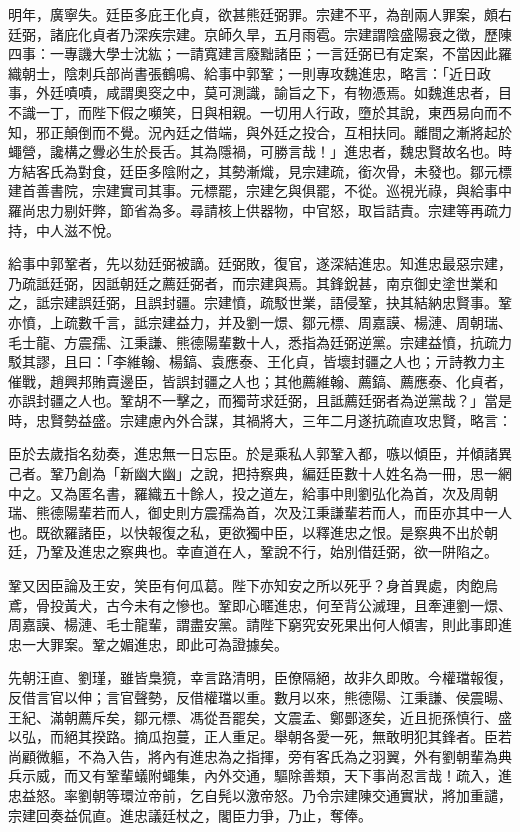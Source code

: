 \begin{pinyinscope}
明年，廣寧失。廷臣多庇王化貞，欲甚熊廷弼罪。宗建不平，為剖兩人罪案，頗右廷弼，諸庇化貞者乃深疾宗建。京師久旱，五月雨雹。宗建謂陰盛陽衰之徵，歷陳四事：一專譏大學士沈紘；一請寬建言廢黜諸臣；一言廷弼已有定案，不當因此羅織朝士，陰刺兵部尚書張鶴鳴、給事中郭鞏；一則專攻魏進忠，略言：「近日政事，外廷嘖嘖，咸謂奧窔之中，莫可測識，諭旨之下，有物憑焉。如魏進忠者，目不識一丁，而陛下假之嚬笑，日與相親。一切用人行政，墮於其說，東西易向而不知，邪正顛倒而不覺。況內廷之借端，與外廷之投合，互相扶同。離間之漸將起於蠅營，讒構之釁必生於長舌。其為隱禍，可勝言哉！」進忠者，魏忠賢故名也。時方結客氏為對食，廷臣多陰附之，其勢漸熾，見宗建疏，銜次骨，未發也。鄒元標建首善書院，宗建實司其事。元標罷，宗建乞與俱罷，不從。巡視光祿，與給事中羅尚忠力剔奸弊，節省為多。尋請核上供器物，中官怒，取旨詰責。宗建等再疏力持，中人滋不悅。

給事中郭鞏者，先以劾廷弼被謫。廷弼敗，復官，遂深結進忠。知進忠最惡宗建，乃疏詆廷弼，因詆朝廷之薦廷弼者，而宗建與焉。其鋒銳甚，南京御史塗世業和之，詆宗建誤廷弼，且誤封疆。宗建憤，疏駁世業，語侵鞏，抉其結納忠賢事。鞏亦憤，上疏數千言，詆宗建益力，并及劉一燝、鄒元標、周嘉謨、楊漣、周朝瑞、毛士龍、方震孺、江秉謙、熊德陽輩數十人，悉指為廷弼逆黨。宗建益憤，抗疏力駁其謬，且曰：「李維翰、楊鎬、袁應泰、王化貞，皆壞封疆之人也；亓詩教力主催戰，趙興邦賄賣邊臣，皆誤封疆之人也；其他薦維翰、薦鎬、薦應泰、化貞者，亦誤封疆之人也。鞏胡不一擊之，而獨苛求廷弼，且詆薦廷弼者為逆黨哉？」當是時，忠賢勢益盛。宗建慮內外合謀，其禍將大，三年二月遂抗疏直攻忠賢，略言：

臣於去歲指名劾奏，進忠無一日忘臣。於是乘私人郭鞏入都，嗾以傾臣，并傾諸異己者。鞏乃創為「新幽大幽」之說，把持察典，編廷臣數十人姓名為一冊，思一網中之。又為匿名書，羅織五十餘人，投之道左，給事中則劉弘化為首，次及周朝瑞、熊德陽輩若而人，御史則方震孺為首，次及江秉謙輩若而人，而臣亦其中一人也。既欲羅諸臣，以快報復之私，更欲獨中臣，以釋進忠之恨。是察典不出於朝廷，乃鞏及進忠之察典也。幸直道在人，鞏說不行，始別借廷弼，欲一阱陷之。

鞏又因臣論及王安，笑臣有何瓜葛。陛下亦知安之所以死乎？身首異處，肉飽烏鳶，骨投黃犬，古今未有之慘也。鞏即心暱進忠，何至背公滅理，且牽連劉一燝、周嘉謨、楊漣、毛士龍輩，謂盡安黨。請陛下窮究安死果出何人傾害，則此事即進忠一大罪案。鞏之媚進忠，即此可為證據矣。

先朝汪直、劉瑾，雖皆梟獍，幸言路清明，臣僚隔絕，故非久即敗。今權璫報復，反借言官以伸；言官聲勢，反借權璫以重。數月以來，熊德陽、江秉謙、侯震暘、王紀、滿朝薦斥矣，鄒元標、馮從吾罷矣，文震孟、鄭鄤逐矣，近且扼孫慎行、盛以弘，而絕其揆路。摘瓜抱蔓，正人重足。舉朝各愛一死，無敢明犯其鋒者。臣若尚顧微軀，不為入告，將內有進忠為之指揮，旁有客氏為之羽翼，外有劉朝輩為典兵示威，而又有鞏輩蟻附蠅集，內外交通，驅除善類，天下事尚忍言哉！疏入，進忠益怒。率劉朝等環泣帝前，乞自髡以激帝怒。乃令宗建陳交通實狀，將加重譴，宗建回奏益侃直。進忠議廷杖之，閣臣力爭，乃止，奪俸。


\end{pinyinscope}
